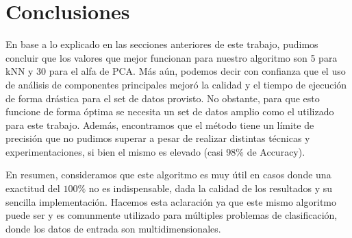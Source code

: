 \section{Conclusiones}

En base a lo explicado en las secciones anteriores de este trabajo, pudimos concluir que los valores que mejor funcionan para nuestro algoritmo son 5 para kNN y 30 para el alfa de PCA. Más aún, podemos decir con confianza que el uso de análisis de componentes principales mejoró la calidad y el tiempo de ejecución de forma drástica para el set de datos provisto. No obstante, para que esto funcione de forma óptima se necesita un set de datos amplio como el utilizado para este trabajo. Además, encontramos que el método tiene un límite de precisión que no pudimos superar a pesar de realizar distintas técnicas y experimentaciones, si bien el mismo es elevado (casi 98\% de Accuracy).

En resumen, consideramos que este algoritmo es muy útil en casos donde una exactitud del $100\%$ no es indispensable, dada la calidad de los resultados y su sencilla implementación. Hacemos esta aclaración ya que este mismo algoritmo puede ser y es comunmente utilizado para múltiples problemas de clasificación, donde los datos de entrada son multidimensionales.

